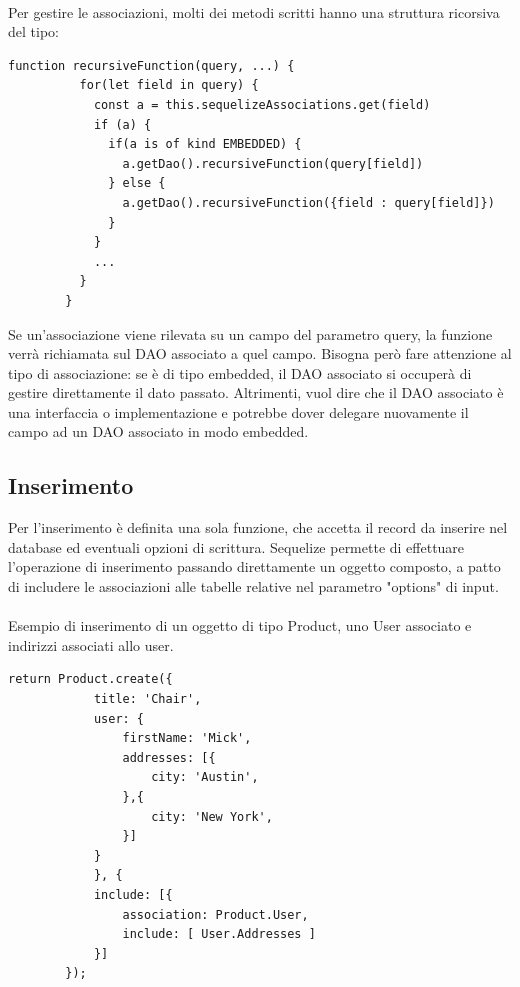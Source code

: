 \documentclass[a4paper, 12pt]{report}
\begin{document}
      \paragraph*{}
      Per gestire le associazioni, molti dei metodi scritti hanno una struttura ricorsiva del tipo:
      \begin{Verbatim}[samepage=true]
        function recursiveFunction(query, ...) {
          for(let field in query) {
            const a = this.sequelizeAssociations.get(field)
            if (a) {
              if(a is of kind EMBEDDED) {
                a.getDao().recursiveFunction(query[field])
              } else {
                a.getDao().recursiveFunction({field : query[field]})
              }
            }
            ...
          }
        }
      \end{Verbatim}
      Se un'associazione viene rilevata su un campo del parametro query, la funzione verrà richiamata sul DAO associato a quel campo. 
      Bisogna però fare attenzione al tipo di associazione: se è di tipo embedded, il DAO associato si occuperà di gestire direttamente il dato passato. Altrimenti, vuol dire che il DAO associato è una interfaccia o implementazione e potrebbe dover
      delegare nuovamente il campo ad un DAO associato in modo embedded.

    \newpage
    \subsection{Inserimento}
      Per l'inserimento è definita una sola funzione, che accetta il record da inserire nel database ed eventuali opzioni di scrittura.
      Sequelize permette di effettuare l'operazione di inserimento passando direttamente un oggetto composto, a patto di includere le associazioni alle tabelle relative
      nel parametro "options" di input.
      \paragraph*{}
      Esempio di inserimento di un oggetto di tipo Product, uno User associato e indirizzi associati allo user.
      \begin{Verbatim}[samepage=true]
        return Product.create({
            title: 'Chair',
            user: {
                firstName: 'Mick',
                addresses: [{
                    city: 'Austin',
                },{
                    city: 'New York',
                }]
            }
            }, {
            include: [{
                association: Product.User,
                include: [ User.Addresses ]
            }]
        });
      \end{Verbatim}
\end{document}
